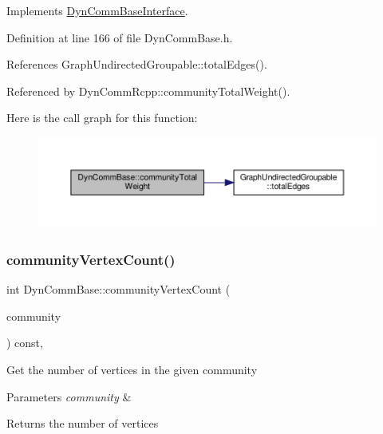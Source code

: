 Implements \hyperlink{classDynCommBaseInterface_a06e0b8a06e9c1067e12f574458db3eb0}{Dyn\+Comm\+Base\+Interface}.



Definition at line 166 of file Dyn\+Comm\+Base.\+h.



References Graph\+Undirected\+Groupable\+::total\+Edges().



Referenced by Dyn\+Comm\+Rcpp\+::community\+Total\+Weight().

Here is the call graph for this function\+:
\nopagebreak
\begin{figure}[H]
\begin{center}
\leavevmode
\includegraphics[width=350pt]{classDynCommBase_a9e7f2493dd9f2381dbfbe94b91ac49f4_cgraph}
\end{center}
\end{figure}
\mbox{\label{classDynCommBase_ad02f1853b63e1ceaf24b05cfdbcf7a49}} 
\subsubsection{\texorpdfstring{community\+Vertex\+Count()}{communityVertexCount()}}
{\footnotesize\ttfamily int Dyn\+Comm\+Base\+::community\+Vertex\+Count (\begin{DoxyParamCaption}\item[{\hyperlink{graphUndirectedGroupable_8h_a914da95c9ea7f14f4b7f875c36818556}{type\+Community}}]{community }\end{DoxyParamCaption}) const\hspace{0.3cm}{\ttfamily [inline]}, {\ttfamily [virtual]}}

Get the number of vertices in the given community


\begin{DoxyParams}{Parameters}
{\em community} & \\
\hline
\end{DoxyParams}
\begin{DoxyReturn}{Returns}
the number of vertices 
\end{DoxyReturn}


